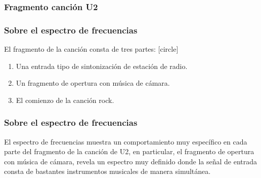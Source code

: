 \documentclass[12pt]{beamer}
\begin{document}
\begin{frame}
\frametitle{Fragmento canción U2}
\begin{figure}
    \centering
\end{figure}
\end{frame}
\begin{frame}
\frametitle{Sobre el espectro de frecuencias}
El fragmento de la canción consta de tres partes:
[circle]
\begin{enumerate}[<+->]
\item Una entrada tipo de sintonización de estación de radio.
\item Un fragmento de opertura con música de cámara.
\item El comienzo de la canción rock.
\end{enumerate}
\end{frame}
\begin{frame}
\frametitle{Sobre el espectro de frecuencias}
El espectro de frecuencias muestra un comportamiento muy específico en cada parte del fragmento de la canción de U2, en particular, el fragmento de opertura con música de cámara, revela un espectro muy definido donde la señal de entrada consta de bastantes instrumentos musicales de manera simultánea.
\end{frame}
\end{document}
